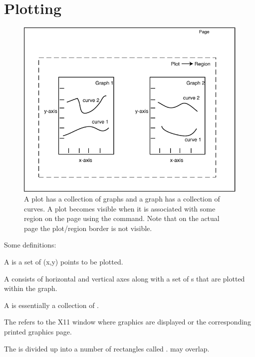 \section{Plotting}
\label{s:plotting}

\begin{figure}[tb]
  \centering
  \includegraphics{plot.pdf}
  \caption[A plot has a collection of graphs.]
{A plot has a collection of graphs and a graph has a 
collection of curves. A plot becomes visible when it is associated
with some region on the page using the  command. Note that
on the actual page the plot/region border is not visible.}
  \label{f:plot}
\end{figure}

Some definitions:
  \vspace*{-3ex}
\begin{description}
\item[Curve] \Newline
A  is a set of (x,y) points to be plotted.
\item[Graph] \Newline
A  consists of horizontal and vertical axes along with a set
of s that are plotted within the graph. 
\item[Plot] \Newline
A  is essentially a collection of .
\item[Page] \Newline
The  refers to the X11 window where graphics are displayed or the 
corresponding printed graphics page.
\item[Region] \Newline
The  is divided up into a number of rectangles called
.  may overlap.
\end{description}

